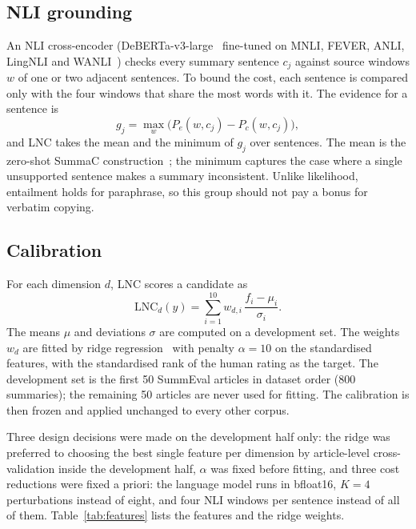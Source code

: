 \subsection{NLI grounding}

An NLI cross-encoder (DeBERTa-v3-large~\citep{he2023debertav3} fine-tuned on MNLI, FEVER, ANLI, LingNLI and WANLI~\citep{laurer2024less}) checks every summary sentence $c_j$ against source windows $w$ of one or two adjacent sentences. To bound the cost, each sentence is compared only with the four windows that share the most words with it. The evidence for a sentence is
\begin{equation}
g_j = \max_{w} \bigl( P_e(w, c_j) - P_c(w, c_j) \bigr),
\end{equation}
and LNC takes the mean and the minimum of $g_j$ over sentences. The mean is the zero-shot SummaC construction~\citep{laban2022summac}; the minimum captures the case where a single unsupported sentence makes a summary inconsistent. Unlike likelihood, entailment holds for paraphrase, so this group should not pay a bonus for verbatim copying.

\subsection{Calibration}

For each dimension $d$, LNC scores a candidate as
\begin{equation}
\mathrm{LNC}_d(y) = \sum_{i=1}^{10} w_{d,i} \, \frac{f_i - \mu_i}{\sigma_i}.
\end{equation}
The means $\mu$ and deviations $\sigma$ are computed on a development set. The weights $w_d$ are fitted by ridge regression~\citep{hoerl1970ridge} with penalty $\alpha=10$ on the standardised features, with the standardised rank of the human rating as the target. The development set is the first 50 SummEval articles in dataset order (800 summaries); the remaining 50 articles are never used for fitting. The calibration is then frozen and applied unchanged to every other corpus.

Three design decisions were made on the development half only: the ridge was preferred to choosing the best single feature per dimension by article-level cross-validation inside the development half, $\alpha$ was fixed before fitting, and three cost reductions were fixed a priori: the language model runs in bfloat16, $K=4$ perturbations instead of eight, and four NLI windows per sentence instead of all of them. Table~\ref{tab:features} lists the features and the ridge weights.

